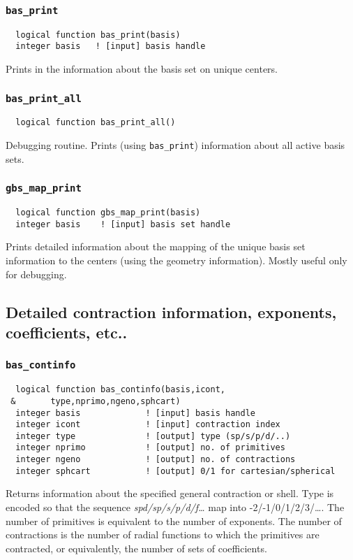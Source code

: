 \subsubsection{{\tt bas\_print}}
\begin{verbatim}
  logical function bas_print(basis)
  integer basis   ! [input] basis handle
\end{verbatim}
Prints in the information about the basis set on unique centers.

\subsubsection{{\tt bas\_print\_all}}
\begin{verbatim}
  logical function bas_print_all()
\end{verbatim}
Debugging routine.  Prints (using \verb+bas_print+) information about
all active basis sets.

\subsubsection{{\tt gbs\_map\_print}}
\begin{verbatim}
  logical function gbs_map_print(basis)
  integer basis    ! [input] basis set handle
\end{verbatim}
Prints detailed information about the mapping of the unique basis set
information to the centers (using the geometry information).  Mostly
useful only for debugging.


\subsection{Detailed contraction information, exponents, coefficients,
  etc..} 

\subsubsection{{\tt bas\_continfo}}
\begin{verbatim}
  logical function bas_continfo(basis,icont,
 &       type,nprimo,ngeno,sphcart)
  integer basis             ! [input] basis handle
  integer icont             ! [input] contraction index
  integer type              ! [output] type (sp/s/p/d/..)
  integer nprimo            ! [output] no. of primitives
  integer ngeno             ! [output] no. of contractions
  integer sphcart           ! [output] 0/1 for cartesian/spherical
\end{verbatim}
Returns information about the specified general contraction or shell.
Type is encoded so that the sequence {\em spd/sp/s/p/d/f\ldots} map
into -2/-1/0/1/2/3/\ldots.  The number of primitives is equivalent to
the number of exponents.  The number of contractions is the number of
radial functions to which the primitives are contracted, or equivalently,
the number of sets of coefficients.

